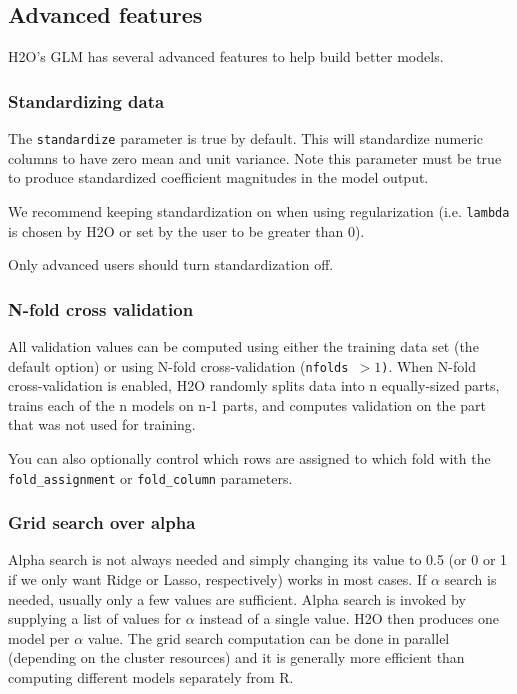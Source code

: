 \subsection{Advanced features}

H2O's GLM has several advanced features to help build better models.

\subsubsection{Standardizing data}

The \texttt{standardize} parameter is true by default.  This will standardize numeric columns to have zero mean and
unit variance.  Note this parameter must be true to produce standardized coefficient magnitudes in the model
output.

We recommend keeping standardization on when using regularization (i.e. \texttt{lambda} is chosen by H2O or set by
the user to be greater than 0).

Only advanced users should turn standardization off.

\subsubsection{N-fold cross validation}

All validation values can be computed using either the training data set (the default option) or using N-fold
cross-validation (\texttt{nfolds $> 1$)}. When N-fold cross-validation is enabled, H2O randomly splits data into n
equally-sized parts, trains each of the n models on n-1 parts, and computes validation on the part that was not
used for training.

\bigskip
\waterExampleInR


You can also optionally control which rows are assigned to which fold with the \texttt{fold\_assignment}
or \texttt{fold\_column} parameters.

\subsubsection{Grid search over alpha}

Alpha search is not always needed and simply changing its value to 0.5 (or 0 or 1 if we only want Ridge or Lasso,
respectively) works in most cases. If $\alpha$ search is needed, usually only a few values are sufficient. Alpha
search is invoked by supplying a list of values for $\alpha$ instead of a single value. H2O then produces one model
per $\alpha$ value. The grid search computation can be done in parallel (depending on the cluster resources) and it
is generally more efficient than computing different models separately from R.

